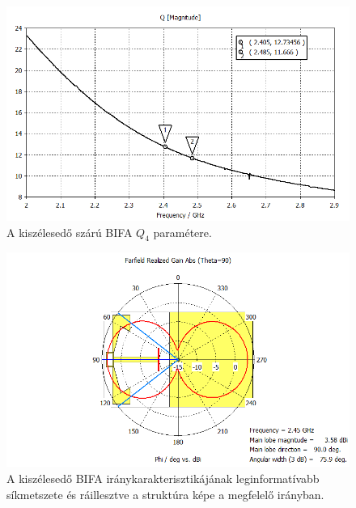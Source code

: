 \begin{figure}[h!]
	\centering
	\includegraphics[width=\textwidth]{kep/results/bifa_broadband_QZ.png}
	\caption{A kiszélesedő szárú BIFA $Q_4$ paramétere.}
	\label{fig:QZ}
\end{figure}
\begin{figure}[h!]
	\centering
	\includegraphics[width=\textwidth]{kep/results/bifa_broadband_pattern_tetha90.png}
	\caption{A kiszélesedő BIFA iránykarakterisztikájának leginformatívabb síkmetszete és ráillesztve a struktúra képe a megfelelő irányban.}
	\label{fig:pattern}
\end{figure}